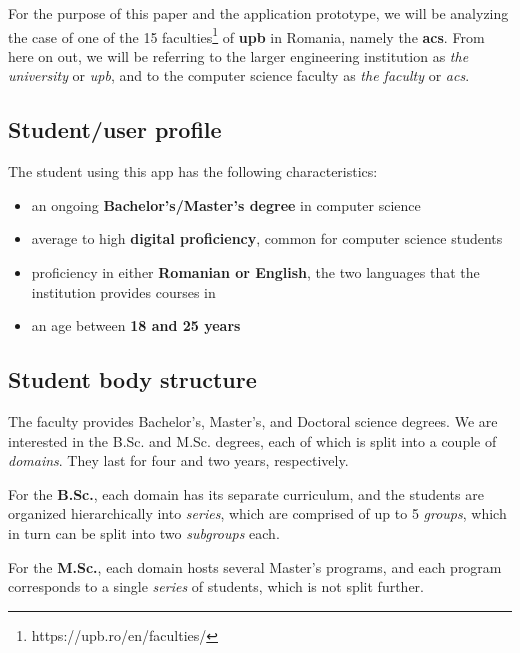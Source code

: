     For the purpose of this paper and the application prototype, we will be analyzing the case of one of the 15 faculties\footnote{https://upb.ro/en/faculties/} of \textbf{\acrlong{upb}} in Romania, namely the \textbf{\acrlong{acs}}. From here on out, we will be referring to the larger engineering institution as \textit{the university} or \textit{\acrshort{upb}}, and to the computer science faculty as \textit{the faculty} or \textit{\acrshort{acs}}.
    
    \subsection{Student/user profile} \label{2:student_profile}
    
        The student using this app has the following characteristics:
        \begin{itemize}
            \item an ongoing \textbf{Bachelor's/Master's degree} in computer science
            \item average to high \textbf{digital proficiency}, common for computer science students%
            \item proficiency in either \textbf{Romanian or English}, the two languages that the institution provides courses in%
            \item an age between \textbf{18 and 25 years}
        \end{itemize}
        
    \subsection{Student body structure} \label{1:student_body_structure}
    
        The faculty provides Bachelor's, Master's, and Doctoral science degrees. We are interested in the B.Sc. and M.Sc. degrees, each of which is split into a couple of \textit{domains}. They last for four and two years, respectively.
        
        For the \textbf{B.Sc.}, each domain has its separate curriculum, and the students are organized hierarchically into \textit{series}, which are comprised of up to 5 \textit{groups}, which in turn can be split into two \textit{subgroups} each.
        
        For the \textbf{M.Sc.}, each domain hosts several Master's programs, and each program corresponds to a single \textit{series} of students, which is not split further.
        
